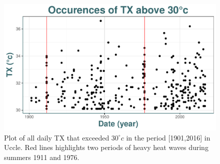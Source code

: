 \begin{figure}[!htb]
\centering\includegraphics[width=0.7\linewidth]{abo.pdf}
\caption{Plot of all daily TX that exceeded $30^{\circ}c$ in the period [1901,2016] in Uccle. Red lines highlights two periods of heavy heat waves during summers 1911 and 1976.}\label{fig:abo}
\end{figure}
	

